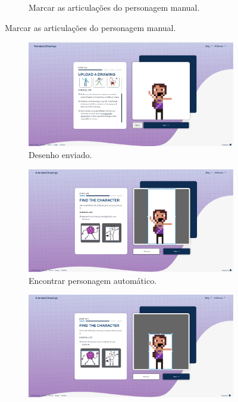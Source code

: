 \begin{figure}[htbp]
\begin{subfigure}{0.45\linewidth}
        \caption{\small Marcar as articulações do personagem manual.}
        \label{fig:sketch1f}
    \end{subfigure}

\end{figure}

\begin{figure}[htbp]
    \centering
    \caption{\small Processo da utilização 2 do Animated Drawnings}
    \label{fig:sketch2}
    \begin{subfigure}{0.6\linewidth}
        \includegraphics[width=1\linewidth]{figs/sketchLab/2tela1.PNG}
        \caption{\small Desenho enviado.}
        \label{fig:sketch2a}
    \end{subfigure}
    \begin{subfigure}{0.45\linewidth}
        \centering
        \includegraphics[width=1\linewidth]{figs/sketchLab/2tela2.PNG}
        \caption{\small Encontrar personagem automático.}
        \label{fig:sketch2b}
    \end{subfigure}
    \begin{subfigure}{0.45\linewidth}
        \centering
        \includegraphics[width=1\linewidth]{figs/sketchLab/2tela3.PNG}

\end{subfigure}
\end{figure}
